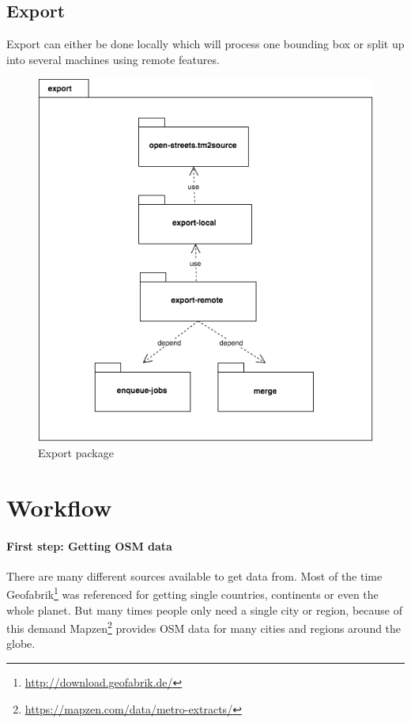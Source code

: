 \newpage
\subsection{Export}
Export can either be done locally which will process one bounding box or
split up into several machines using remote features.

\begin{figure}[h]
  \includegraphics[scale=0.6]{images/export_package.png}
  \caption{Export package}
\end{figure}

\section{Workflow}\label{workflow}

\paragraph{First step: Getting OSM
data}\label{first-step-getting-osm-data}

There are many different sources available to get \osm{} data from. Most of
the time Geofabrik\footnote{\url{http://download.geofabrik.de/}} was
referenced for getting single countries, continents or even the whole
planet. But many times people only need a single city or region, because
of this demand
Mapzen\footnote{\url{https://mapzen.com/data/metro-extracts/}} provides
OSM data for many cities and regions around the globe.

